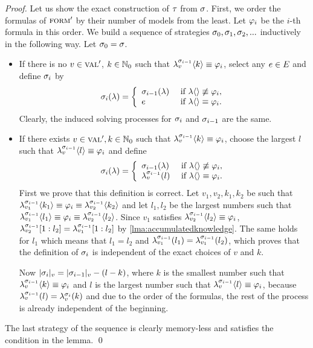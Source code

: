 \begin{proof}
Let us show the exact construction of $\tau$ from $\sigma$.
First, we order the formulas of ${\textsc{form}'}$ by their number of models
  from the least. Let $\varphi_i$ be the $i$-th formula in this order.
We build a sequence of strategies $\sigma_0, \sigma_1, \sigma_2, ...$
  inductively in the following way.
Let $\sigma_0 = \sigma$.
\begin{itemize}
\item If there is no $v\in\textsc{val}'$, $k\in\mathbb{N}_0$ such that
  $\lambda^{\sigma_{i-1}}_{v}\langle k\rangle \equiv \varphi_i$, select any $e\in E$ and
  define $\sigma_i$ by
\[
\sigma_i(\lambda) = \left\{
 \begin{array}{lll}
 \sigma_{i-1}(\lambda)  & \textrm{ if } \lambda\langle\rangle\not\equiv\varphi_i,\\
 e               & \textrm{ if } \lambda\langle\rangle\equiv\varphi_i.
 \end{array}
 \right.
\]
Clearly, the induced solving processes for $\sigma_i$ and $\sigma_{i-1}$ are the same.

\item If there exists $v\in\textsc{val}', k\in\mathbb{N}_0$ such that
  $\lambda^{\sigma_{i-1}}_{v}\langle k\rangle \equiv \varphi_i$, choose the largest $l$ such that
  $\lambda^{\sigma_{i-1}}_{v}\langle l\rangle \equiv \varphi_i$ and define
\[
\sigma_i(\lambda) = \left\{
 \begin{array}{lll}
 \sigma_{i-1}(\lambda)            & \textrm{ if } \lambda\langle\rangle\not\equiv\varphi_i,\\
 \lambda^{\sigma_{i-1}}_{v}(l)   & \textrm{ if } \lambda\langle\rangle\equiv\varphi_i.
 \end{array}
 \right.
\]
First we prove that this definition is correct.
Let $v_1, v_2, k_1, k_2$ be such that
  $\lambda^{\sigma_{i-1}}_{v_1}\langle k_1\rangle\equiv\varphi_i\equiv\lambda^{\sigma_{i-1}}_{v_2}\langle k_2\rangle$
and let $l_1, l_2$ be the largest numbers such that
  $\lambda^{\sigma_{i-1}}_{v_1}\langle l_1\rangle\equiv\varphi_i\equiv\lambda^{\sigma_{i-1}}_{v_2}\langle l_2\rangle$.
Since $v_1$ satisfies $\lambda^{\sigma_{i-1}}_{v_2}\langle l_2\rangle\equiv\varphi_i$,
  $\lambda^{\sigma_{i-1}}_{v_2}[1:l_2] = \lambda^{\sigma_{i-1}}_{v_1}[1:l_2]$
  by \autoref{lma:accumulatedknowledge}.
The same holds for $l_1$ which means that $l_1 = l_2$ and
  $\lambda^{\sigma_{i-1}}_{v_1}(l_1) = \lambda^{\sigma_{i-1}}_{v_1}(l_2)$, which
  proves that the definition of $\sigma_i$ is independent of the exact choices
  of $v$ and $k$.

Now $|\sigma_i|_{v} = |\sigma_{i-1}|_{v} - (l-k)$, where
  $k$ is the smallest number such that
  $\lambda^{\sigma_{i-1}}_{v}\langle k\rangle\equiv\varphi_i$ and
  $l$ is the largest number such that
  $\lambda^{\sigma_{i-1}}_{v}\langle l\rangle\equiv\varphi_i $,
  because
  $\lambda^{\sigma_{i-1}}_{v}(l) = \lambda^{\sigma_{i}}_{v}(k)$ and due to the order of the formulas,
  the rest of the process is already independent of the beginning.
\end{itemize}

The last strategy of the sequence is clearly memory-less and satisfies the
  condition in the lemma. \qed
\end{proof}

